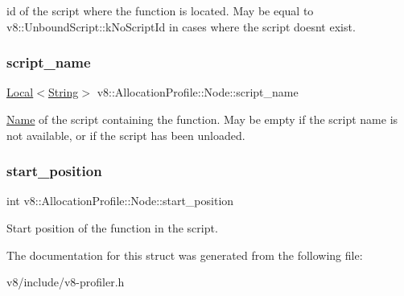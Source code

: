 id of the script where the function is located. May be equal to v8\+::\+Unbound\+Script\+::k\+No\+Script\+Id in cases where the script doesn\textquotesingle{}t exist. \mbox{\label{structv8_1_1AllocationProfile_1_1Node_acd6567ac06a0bae713390559128e9c62}} 
\subsubsection{\texorpdfstring{script\+\_\+name}{script\_name}}
{\footnotesize\ttfamily \mbox{\hyperlink{classv8_1_1Local}{Local}}$<$\mbox{\hyperlink{classv8_1_1String}{String}}$>$ v8\+::\+Allocation\+Profile\+::\+Node\+::script\+\_\+name}

\mbox{\hyperlink{classv8_1_1Name}{Name}} of the script containing the function. May be empty if the script name is not available, or if the script has been unloaded. \mbox{\label{structv8_1_1AllocationProfile_1_1Node_a6caceefbf826a0425adc74331cc7a910}} 
\subsubsection{\texorpdfstring{start\+\_\+position}{start\_position}}
{\footnotesize\ttfamily int v8\+::\+Allocation\+Profile\+::\+Node\+::start\+\_\+position}

Start position of the function in the script. 

The documentation for this struct was generated from the following file\+:\begin{DoxyCompactItemize}
\item 
v8/include/v8-\/profiler.\+h\end{DoxyCompactItemize}
